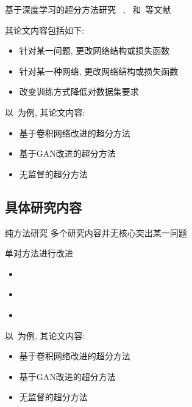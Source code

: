 \begin{frame}{基于深度学习的超分方法研究}
    ~\cite{wangyf}, ~\cite{zhengk}和~\cite{fengxb}等文献

    其论文内容包括如下:
    \begin{itemize}
        \item 针对某一问题, 更改网络结构或损失函数
        \item 针对某一种网络, 更改网络结构或损失函数
        \item 改变训练方式降低对数据集要求
    \end{itemize}

    以~\cite{fengxb}为例, 其论文内容:
    \begin{itemize}
        \item 基于卷积网络改进的超分方法
        \item 基于GAN改进的超分方法
        \item 无监督的超分方法
    \end{itemize}    
\end{frame}

\subsection{具体研究内容}

\begin{frame}{纯方法研究}
    多个研究内容并无核心突出某一问题

    单对方法进行改进
    \begin{itemize}
        \item ~\cite{guoxx}
        \item ~\cite{zhaoxd}
        \item ~\cite{liz}
    \end{itemize}

    以~\cite{fengxb}为例, 其论文内容:
    \begin{itemize}
        \item 基于卷积网络改进的超分方法
        \item 基于GAN改进的超分方法
        \item 无监督的超分方法
    \end{itemize}    

\end{frame}

